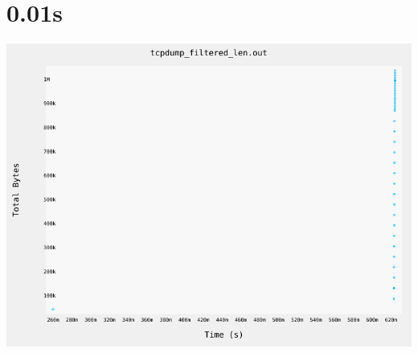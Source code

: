 \documentclass{article}
\begin{document}
    \clearpage

\section{0.01s}
    \noindent\begin{minipage}{.45\textwidth}
    
    \end{minipage}\hfill
    \begin{minipage}{.45\textwidth}
    
    \end{minipage}
    
    \begin{center}
        \includegraphics[angle=90]{set_c_0.01s/plot.png}
    \end{center}

    \clearpage


\end{document}
